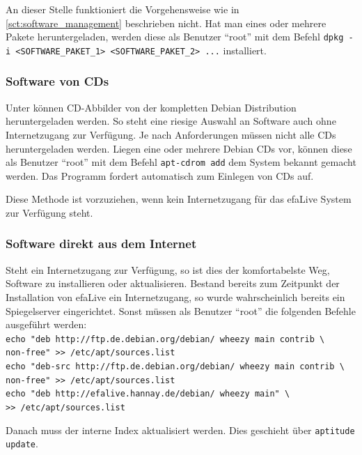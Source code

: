 \documentclass[a4paper,12pt,twoside]{article}
\begin{document}
An dieser Stelle funktioniert die Vorgehensweise wie in \ref{sct:software_management}
beschrieben nicht. Hat man eines oder mehrere Pakete heruntergeladen,
werden diese als Benutzer "`root"' mit dem
Befehl \texttt{dpkg -i {\textless}SOFTWARE\_PAKET\_1{\textgreater}
{\textless}SOFTWARE\_PAKET\_2{\textgreater} ...} installiert. 


\subsubsection{Software von CDs}
\label{sct:software_cd}
Unter \cite{DEB4} können CD-Abbilder von der kompletten Debian
Distribution heruntergeladen werden. So steht eine riesige Auswahl an
Software auch ohne Internetzugang zur Verfügung. Je nach Anforderungen
müssen nicht alle CDs heruntergeladen werden. Liegen eine oder mehrere
Debian CDs vor, können diese als Benutzer
"`root"' mit dem Befehl
\texttt{apt-cdrom add} dem System bekannt gemacht
werden. Das Programm fordert automatisch zum Einlegen von CDs auf.

Diese Methode ist vorzuziehen, wenn kein Internetzugang für das efaLive
System zur Verfügung steht.


\subsubsection{Software direkt aus dem Internet}
\label{sct:software_internet}
Steht ein Internetzugang zur Verfügung, so ist dies der komfortabelste
Weg, Software zu installieren oder aktualisieren. Bestand bereits zum
Zeitpunkt der Installation von efaLive ein Internetzugang, so wurde
wahrscheinlich bereits ein Spiegelserver eingerichtet. Sonst müssen als
Benutzer "`root"' die folgenden Befehle ausgeführt werden:
\bigskip
\\
\texttt{echo "deb http://ftp.de.debian.org/debian/ wheezy main contrib \textbackslash\\
    non-free"\ {\textgreater}{\textgreater} /etc/apt/sources.list}
\\
\texttt{echo "deb-src http://ftp.de.debian.org/debian/ wheezy main contrib \textbackslash\\
    non-free"\ {\textgreater}{\textgreater} /etc/apt/sources.list}
\\
\texttt{echo "deb http://efalive.hannay.de/debian/ wheezy main" \textbackslash\\
    {\textgreater}{\textgreater} /etc/apt/sources.list}

\bigskip
Danach muss der interne Index aktualisiert werden. Dies geschieht über
\texttt{aptitude update}.
\end{document}
